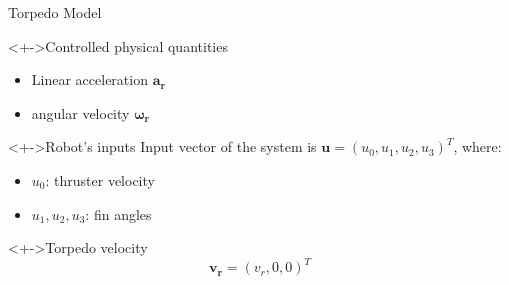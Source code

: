 \documentclass[10pt, xcolor={usenames, dvipsnames}]{beamer}
\begin{document}
        \begin{frame}{Torpedo Model}
            \begin{minipage}[t]{.48\textwidth}
                \begin{block}<+->{Controlled physical quantities}
                    \vspace{2.5mm}
                    \begin{itemize}
                        \item Linear acceleration $\mathbf{a_r}$
                        \item angular velocity $\mathbf{\omega_r}$
                    \end{itemize}
                \end{block}
                \begin{block}<+->{Robot's inputs}
                    \centering
                    Input vector of the system is $\mathbf{u} = (u_0, u_1, u_2, u_3)^T$, where:
                    \begin{itemize}
                        \item $u_0$: thruster velocity \\
                        \item $u_1, u_2, u_3$: fin angles
                    \end{itemize}
                \end{block}
            \end{minipage}
            \hfill
            \begin{minipage}[t]{.48\textwidth}
                \begin{block}<+->{Torpedo velocity}
                    \vspace{2.5mm}
                    \begin{equation}
                        \mathbf{v_r} = (v_r, 0, 0)^T
                    \end{equation}
                \end{block}
            \end{minipage}
        \end{frame}
\end{document}
